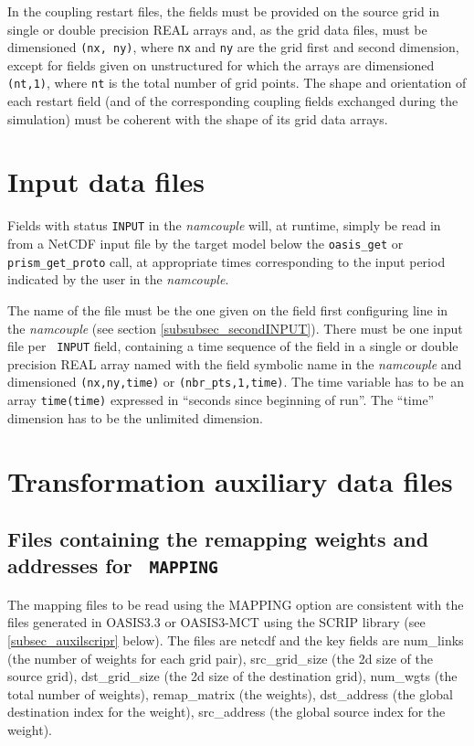 In the coupling restart files, the fields must be provided on the source grid in single or double
precision REAL arrays and, as the grid data files, must be dimensioned {\tt (nx,
ny)}, where {\tt nx} and {\tt ny} are the grid first and second
dimension, except for fields given on unstructured 
for which the arrays are dimensioned {\tt (nt,1)},
where {\tt nt} is the total number of grid points.  The shape
and orientation of each restart field (and of the corresponding
coupling fields exchanged during the simulation) must be coherent with
the shape of its grid data arrays. 


\section{Input data files}
\label{subsec_inputdata}

Fields with status {\tt INPUT} in the {\it namcouple} will, at
  runtime, simply be read in from a NetCDF input file by the target
  model below the {\tt oasis\_get} or {\tt prism\_get\_proto} call, at appropriate
  times corresponding to the input period indicated by the user in the
  {\it namcouple}. 

The name of the file must be the one given on the field first
configuring line in the {\it namcouple} (see section
\ref{subsubsec_secondINPUT}). There must be one input file per {\tt
INPUT} field, containing a time sequence of the field in a single or
double precision REAL array
named with the field symbolic name in the {\it namcouple} and
dimensioned {\tt (nx,ny,time)} or {\tt (nbr\_pts,1,time)}.  The time
variable has to be an array {\tt time(time)} expressed in
``seconds since beginning of run''. The ``time'' dimension has to
be the unlimited dimension. 


\section{Transformation auxiliary data files}
\label{subsec_transformationdata}

\subsection{Files containing the remapping weights and addresses for {\tt
  MAPPING}}
\label{subsec_mapdata}

The mapping files to be read using the MAPPING option are consistent
with the files generated in OASIS3.3 or OASIS3-MCT using the SCRIP
library (see \ref{subsec_auxilscripr} below). The files are netcdf and the
key fields are num\_links (the number of weights for each grid pair), src\_grid\_size
(the 2d size of the source grid), dst\_grid\_size
(the 2d size of the destination grid), num\_wgts (the
total number of weights), remap\_matrix (the weights), dst\_address
(the global destination index for the weight), src\_address (the global
source index for the weight).

